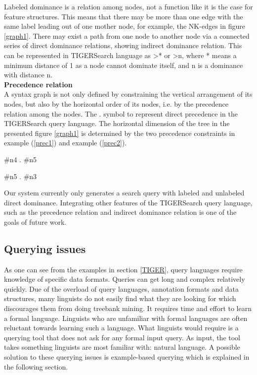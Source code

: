 \documentclass[]{scrartcl}
\theoremstyle{exmp}
\begin{document}
Labeled dominance is a relation among nodes, not a function like it is the case for feature structures. This means that there may be more than one edge with the same label leading out of one mother node, for example, the NK-edges in figure \ref{graph1}.
There may exist a path from one node to another node via a connected series of direct dominance relations, showing indirect dominance relation. This can be represented in TIGERSearch language as >* or >n, where * means a minimum distance of 1 as a node cannot dominate itself, and n is a dominance with distance n.\\

\vspace{0.2cm}
\textbf{Precedence relation} \\
A syntax graph is not only defined by constraining the vertical arrangement of its nodes, but also by the horizontal order of its nodes, i.e. by the precedence relation among the nodes. The . symbol to represent direct precedence in the TIGERSearch query language. The horizontal dimension of the tree in the presented figure \ref{graph1} is determined by the two precedence constraints in example (\ref{prec1}) and example (\ref{prec2}). 
\begin{exe}
	\ex \label{prec1}
\#n4 . \#n5 
\end{exe}
\begin{exe}
	\ex \label{prec2}
\#n5 . \#n3
\end{exe}
\vspace{0.2cm}
Our system currently only generates a search query with labeled and unlabeled direct dominance. Integrating other features of the TIGERSearch query language, such as the precedence relation and indirect dominance relation is one of the goals of future work.

\subsection{Querying issues}
As one can see from the examples in section \ref{TIGER}, query languages require knowledge of specific data formats. Queries can get long and complex relatively quickly. Due of the overload of query languages, annotation formats and data structures, many linguists do not easily find what they are looking for which discourages them from doing treebank mining. It requires time and effort to learn a formal language. Linguists who are unfamiliar with formal languages are often reluctant towards learning such a language. What linguists would require is a querying tool that does not ask for any formal input query. As input, the tool takes something linguists are most familiar with: natural language. A possible solution to these querying issues is example-based querying which is explained in the following section. 
 
\end{document}
